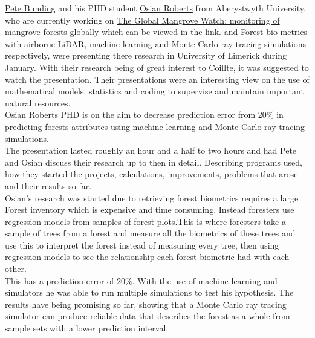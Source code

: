 \documentclass[a4paper,11pt,twoside]{report}
\begin{document}
 \href{https://www.eorc.jaxa.jp/ALOS/kyoto/jan2017_kc23/pdf/1-09_KC23_GMW-Bunting.pdf}{Pete Bunding} and his PHD student \href{https://pure.aber.ac.uk/portal/en/persons/osian-dafydd-roberts(a3ce4766-2a73-4338-9993-f5ab467767ec).html}{Osian Roberts} from Aberystwyth University, who are currently working on \href{https://www.globalmangrovewatch.org/author/gmwpjb/}{The Global Mangrove Watch: monitoring of mangrove forests globally} which can be viewed in the link. and Forest bio metrics with airborne LiDAR, machine learning and Monte Carlo ray tracing simulations respectively, were presenting there research in University of Limerick during January. With their research being of great interest to Coillte, it was suggested to watch the presentation. Their presentations were an interesting view on the use of mathematical models, statistics and coding to supervise and maintain important natural resources. \\
Osian Roberts PHD is on the aim to decrease prediction error from 20\% in predicting forests attributes using machine learning and Monte Carlo ray tracing simulations. \\
The presentation lasted roughly an hour and a half to two hours and had Pete and Osian discuss their research up to then in detail. Describing programs used, how they started the projects, calculations, improvements, problems that arose and their results so far.\\
Osian's research was started due to retrieving forest biometrics requires a large Forest inventory which is expensive and time consuming. Instead foresters use regression models from samples of forest plots.This is where foresters take a sample of trees from a forest and measure all the biometrics of these trees and use this to interpret the forest instead of measuring every tree, then using regression models to see the relationship each forest biometric had with each other.\\ This has a prediction error of 20\%. With the use of machine learning and simulators he was able to run multiple simulations to test his hypothesis. The results have being promising so far, showing that a Monte Carlo ray tracing simulator can produce reliable data that describes the forest as a whole from sample sets with a lower prediction interval.

\end{document}
